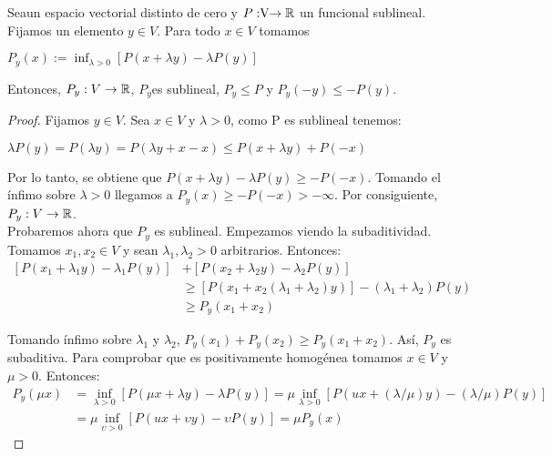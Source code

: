 	\begin{lemaBox}\label{lema1}
		Sea\vecSpace un espacio vectorial distinto de cero y $P:\vecSpace \rightarrow \RR$ un funcional sublineal. Fijamos un elemento $ y \in V $. Para todo $ x \in V $ tomamos  
		\begin{center}
			$ P_y(x) := \inf_{\lambda > 0} \left[P(x+\lambda y) - \lambda P(y)\right] $
		\end{center}
		
		Entonces, $ P_y:V \rightarrow \mathbb{R}$, $ P_y $es sublineal, $ P_y \leq P $ y $ P_y (-y) \leq  -P(y)$.
	\end{lemaBox} 
	\begin{proof}
		Fijamos $ y \in V $. Sea $ x \in V $ y $ \lambda > 0$, como P es sublineal tenemos: 
		\begin{center}
			$ \lambda P(y) = P(\lambda y) =P(\lambda y +x-x) \leq P(x+\lambda y)+ P(-x)$
		\end{center}
		
		Por lo tanto, se obtiene que $ P(x+\lambda y) - \lambda P(y) \geq -P(-x) $.  Tomando el ínfimo sobre $ \lambda >0 $ llegamos a $ P_{y}(x)\geq -P(-x) > -\infty$. Por consiguiente, $ P_y:V \rightarrow \mathbb{R}$. \\
		
		Probaremos ahora que $ P_y $ es sublineal. Empezamos viendo la subaditividad. Tomamos $ x_1, x_2 \in V $ y sean $ \lambda_1, \lambda_2 > 0$ arbitrarios. Entonces: 
		\begin{equation*}
		\begin{split}
		\left[ P(x_1 + \lambda_1 y) - \lambda_1 P(y) \right] &+ \left[ P(x_2 + \lambda_2 y) - \lambda_2 P(y) \right] \\
		& \geq \left[ P(x_1 + x_2 (\lambda_1+\lambda_2)y) \right] - (\lambda_1+\lambda_2) P(y) \\
		&\geq P_y (x_1 + x_2 )
		\end{split}
		\end{equation*}
		
		Tomando ínfimo sobre $ \lambda_1 $ y $ \lambda_2 $, $  P_y (x_1)  + P_y (x_2 ) \geq P_y (x_1 + x_2 ) $. Así, $ P_y $ es subaditiva. Para comprobar que es positivamente homogénea tomamos $ x \in V $ y $ \mu > 0 $. Entonces:
		\begin{equation*}
		\begin{split}
		P_y (\mu x) &= \inf_{\lambda > 0} \left[P(\mu x+\lambda y) - \lambda P(y)\right] = \mu \inf_{\lambda > 0} \left[P(u x+ (\lambda / \mu) y) - (\lambda / \mu) P(y)\right] \\
		&= \mu \inf_{\upsilon > 0} \left[P(u x+ \upsilon y) - \upsilon  P(y)\right] = \mu P_y (x)
		\end{split}
		\end{equation*}
		

\end{proof}
